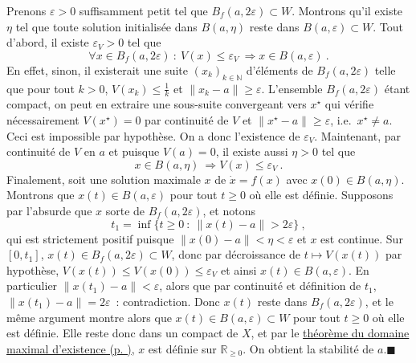 \hypertarget{duxe9monstration-8}{}
\begin{preuve}\label{duxe9monstration-8}
Prenons \(\varepsilon>0\) suffisamment petit tel que
\(B_f(a,2\varepsilon)\subset W\). Montrons qu'il existe \(\eta\) tel que
toute solution initialisée dans \(B(a,\eta)\) reste dans
\(B(a,\varepsilon)\subset W\). Tout d'abord, il existe
\(\varepsilon_V>0\) tel que \[
\forall x\in B_f(a,2\varepsilon) \ : \ V(x)\leq \varepsilon_V \ \Longrightarrow x\in B(a,\varepsilon) \ .
\] En effet, sinon, il existerait une suite \((x_k)_{k\in \mathbb{N}}\)
d'éléments de \(B_f(a,2\varepsilon)\) telle que pour tout \(k>0\),
\(V(x_k)\leq \frac{1}{k}\) et \(\|x_k-a\|\geq \varepsilon\). L'ensemble
\(B_f(a,2\varepsilon)\) étant compact, on peut en extraire une
sous-suite convergeant vers \(x^\star\) qui vérifie nécessairement
\(V(x^\star)=0\) par continuité de \(V\) et
\(\|x^\star-a\|\geq \varepsilon\), i.e.~\(x^\star \neq a\). Ceci est
impossible par hypothèse. On a donc l'existence de \(\varepsilon_V\).
Maintenant, par continuité de \(V\) en \(a\) et puisque \(V(a)=0\), il
existe aussi \(\eta>0\) tel que \[
x\in B(a,\eta)  \ \Longrightarrow V(x)\leq \varepsilon_V \ .
\] Finalement, soit une solution maximale \(x\) de \(\dot x = f(x)\)
avec \(x(0)\in B(a,\eta)\). Montrons que \(x(t)\in B(a,\varepsilon)\)
pour tout \(t\geq 0\) où elle est définie. Supposons par l'absurde que
\(x\) sorte de \(B_f(a,2\varepsilon)\), et notons \[
t_1=\inf\{t\geq 0 \ : \ \|x(t)-a\|> 2\varepsilon\} \ ,
\] qui est strictement positif puisque \(\|x(0)-a\|<\eta<\varepsilon\)
et \(x\) est continue. Sur \([0,t_1]\), \(x(t)\in B_f(a,2\varepsilon)\subset W\),
donc par décroissance de \(t\mapsto V(x(t))\) par hypothèse,
\(V(x(t))\leq V(x(0))\leq \varepsilon_V\) et ainsi
\(x(t)\in B(a,\varepsilon)\). En particulier \(\|x(t_1)-a\|<\varepsilon\),
alors que par continuité et définition de \(t_1\),
\(\|x(t_1)-a\| = 2\varepsilon\)~: contradiction. Donc \(x(t)\) reste dans
\(B_f(a,2\varepsilon)\), et le même argument montre alors que
\(x(t)\in B(a,\varepsilon)\subset W\) pour tout \(t\geq 0\) où elle est
définie. Elle reste donc dans un compact de \(X\), et par le
\protect\hyperlink{theo_bouts}{théorème du domaine maximal d'existence
(p. \pageref*{theo_bouts})}, \(x\) est définie sur
\(\mathbb{R}_{\geq 0}\). On obtient la stabilité de
\(a\).\hfill$\blacksquare$
\end{preuve}

